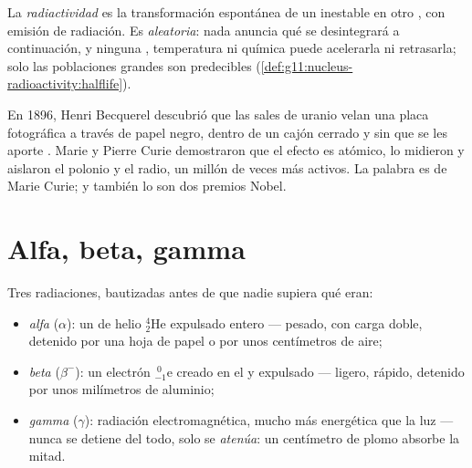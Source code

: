 \begin{definition}[Radiactividad]\label{def:g11:nucleus-radioactivity:radioactivity}
La \emph{radiactividad} es la transformación
espontánea de un  inestable en otro , con emisión de
radiación. Es \emph{aleatoria}: nada anuncia qué  se desintegrará
a continuación, y ninguna , temperatura ni química puede
acelerarla ni retrasarla; solo las poblaciones grandes son predecibles
(\cref{def:g11:nucleus-radioactivity:halflife}).
\end{definition}

\begin{remark}\label{rem:g11:nucleus-radioactivity:curie}
En 1896, Henri Becquerel descubrió que las sales de uranio velan una
placa fotográfica a través de papel negro, dentro de un cajón cerrado y
sin que se les aporte . Marie y Pierre Curie demostraron que el
efecto es atómico, lo midieron y aislaron el polonio y el radio, un
millón de veces más activos. La palabra \emph{} es de Marie
Curie; y también lo son dos premios Nobel.
\end{remark}

\section{Alfa, beta, gamma}

\begin{definition}\label{def:g11:nucleus-radioactivity:abg}
Tres radiaciones, bautizadas antes de que nadie supiera qué eran:
\begin{itemize}
  \item \emph{alfa} ($\alpha$): un  de helio
        ${}^{4}_{2}\mathrm{He}$ expulsado entero --- pesado, con carga
        doble, detenido por una hoja de papel o por unos centímetros de
        aire;
  \item \emph{beta} ($\beta^-$): un electrón
        ${}^{\;0}_{-1}\mathrm{e}$ creado en el  y expulsado ---
        ligero, rápido, detenido por unos milímetros de aluminio;
  \item \emph{gamma} ($\gamma$): radiación
        electromagnética, mucho más energética que la luz --- nunca se
        detiene del todo, solo se
        \emph{atenúa}: un centímetro de plomo absorbe
        la mitad.
\end{itemize}
\end{definition}

